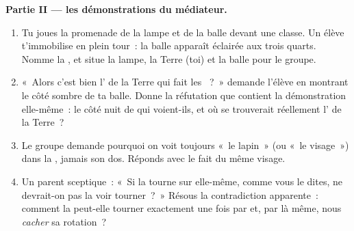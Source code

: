 \begin{problem}
\medskip\noindent\textbf{Partie II --- les démonstrations du
médiateur.}
\begin{enumerate}[resume]
  \item Tu joues la promenade de la lampe et de la balle devant une
        classe. Un élève t'immobilise en plein tour~: la balle
        apparaît éclairée aux trois quarts. Nomme la , et
        situe la lampe, la Terre (toi) et la balle pour le groupe.
  \item «~Alors c'est bien l' de la Terre qui fait les
        ~?~» demande l'élève en montrant le côté sombre de ta
        balle. Donne la réfutation que contient la démonstration
        elle-même~: le côté nuit de qui voient-ils, et où se
        trouverait réellement l' de la Terre~?
  \item Le groupe demande pourquoi on voit toujours «~le lapin~»
        (ou «~le visage~») dans la , jamais son dos. Réponds
        avec le fait du même visage.
  \item Un parent sceptique~: «~Si la  tourne sur elle-même,
        comme vous le dites, ne devrait-on pas la voir tourner~?~»
        Résous la contradiction apparente~: comment la  peut-elle
        tourner exactement une fois par  et, par là même,
        nous \emph{cacher} sa rotation~?
\end{enumerate}


\end{problem}
